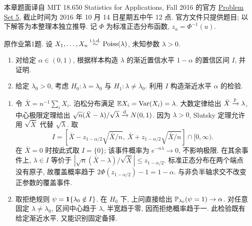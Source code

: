 \label{chap:ps05}
本章题面译自 MIT 18.650 Statistics for Applications, Fall 2016 的官方 \href{https://ocw.mit.edu/courses/18-650-statistics-for-applications-fall-2016/resources/problem-set-5/}{Problem Set 5}, 截止时间为 2016 年 10 月 14 日星期五中午 12 点. 官方文件只提供题目; 以下解答为本整理本独立推导. 记 $\Phi$ 为标准正态分布函数, $z_u=\Phi^{-1}(u)$.

\begin{exercise}\label{ps05:p01}
原作业第1题. 设 $X_1,\ldots,X_n\stackrel{\mathrm{i.i.d.}}{\sim}\operatorname{Poiss}(\lambda)$, 未知参数 $\lambda>0$.
\begin{enumerate}[label=\arabic*.]
\item 对给定 $\alpha\in(0,1)$, 根据样本构造 $\lambda$ 的渐近置信水平 $1-\alpha$ 的置信区间 $I$, 并证明.
\item 给定 $\lambda_0>0$, 考虑 $H_0:\lambda=\lambda_0$ 与 $H_1:\lambda\ne\lambda_0$. 利用 $I$ 构造渐近水平 $\alpha$ 的检验.
\end{enumerate}
\end{exercise}
\begin{solution}
\begin{enumerate}[label=\arabic*.]
\item 令 $\bar X=n^{-1}\sum_iX_i$. 泊松分布满足 $\mathbb E X_i=\operatorname{Var}(X_i)=\lambda$. 大数定律给出 $\bar X\xrightarrow{\mathbb P}\lambda$, 中心极限定理给出 $\sqrt n(\bar X-\lambda)/\sqrt\lambda\xrightarrow{\mathrm d} N(0,1)$. 因为 $\lambda>0$, Slutsky 定理允许用 $\sqrt{\bar X}$ 代替 $\sqrt\lambda$. 取
\[
 I=\left[\bar X-z_{1-\alpha/2}\sqrt{\bar X/n},\ \bar X+z_{1-\alpha/2}\sqrt{\bar X/n}\right]\cap[0,\infty).
\]
在 $\bar X=0$ 时按此式取 $I=\{0\}$; 该事件概率为 $e^{-n\lambda}\to0$, 不影响极限. 在其余事件上, $\lambda\in I$ 等价于 $|\sqrt n(\bar X-\lambda)/\sqrt{\bar X}|\le z_{1-\alpha/2}$. 标准正态分布在两个端点没有原子, 故覆盖概率趋于 $2\Phi(z_{1-\alpha/2})-1=1-\alpha$. 与非负半轴求交不改变正参数的覆盖事件.
\item 取拒绝规则 $\psi=\mathbf 1\{\lambda_0\notin I\}$. 在 $H_0$ 下, 上问直接给出 $\mathbb P_{\lambda_0}(\psi=1)\to\alpha$. 对任意固定 $\lambda\ne\lambda_0$, 区间中心趋于 $\lambda$, 半宽趋于零, 因而拒绝概率趋于一. 此检验既有给定渐近水平, 又能识别固定备择.
\end{enumerate}
\end{solution}

